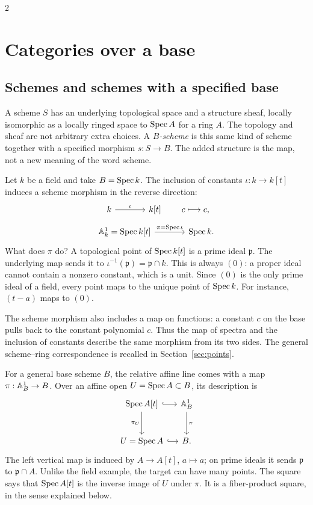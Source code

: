 \documentclass[12pt]{memoir}
\begin{document}
\begin{multicols}{2}
\section[Categories and categories over a base]{Categories over a base}\label{sec:categories}

\subsection{Schemes and schemes with a specified base}
A scheme $S$ has an underlying topological space and a structure sheaf,
locally isomorphic as a locally ringed space to $\operatorname{Spec} A$ for a ring $A$.
The topology and sheaf are not arbitrary extra choices. A
\emph{$B$-scheme} is this same kind of scheme together with a specified
morphism $s:S\to B$. The added structure is the map, not a new meaning
of the word scheme.

\begin{Ex}
Let $k$ be a field and take $B=\operatorname{Spec} k$. The inclusion of constants
$\iota:k\to k[t]$ induces a scheme morphism in the reverse direction:
\[
\begin{tikzcd}[column sep=large]
k \arrow[r,"\iota"] & k[t]
\end{tikzcd}
\qquad c\longmapsto c,
\]
\[
\begin{tikzcd}[column sep=large]
\bA^1_k=\Spec k[t] \arrow[r,"\pi=\Spec\iota"] & \Spec k.
\end{tikzcd}
\]
What does $\pi$ do? A topological point of $\operatorname{Spec} k[t]$ is a prime
ideal $\mathfrak p$. The underlying map sends it to
$\iota^{-1}(\mathfrak p)=\mathfrak p\cap k$. This is always $(0)$:
a proper ideal cannot contain a nonzero constant, which is a unit.
Since $(0)$ is the only prime ideal of a field, every point maps to
the unique point of $\operatorname{Spec} k$. For instance, $(t-a)$ maps to $(0)$.

The scheme morphism also includes a map on functions: a constant $c$
on the base pulls back to the constant polynomial $c$. Thus the map
of spectra and the inclusion of constants describe the same morphism
from its two sides. The general scheme--ring correspondence is recalled
in Section~\ref{sec:points}.
\end{Ex}

\begin{Ex}
For a general base scheme $B$, the relative affine line comes with
a map $\pi:\mathbb{A}^1_B\to B$. Over an affine open $U=\operatorname{Spec} A\subset B$,
its description is
\[
\begin{tikzcd}[column sep=small,row sep=large]
\Spec A[t] \arrow[r,hook] \arrow[d,"\pi_U"']
 &\bA^1_B \arrow[d,"\pi"]\\
U=\Spec A \arrow[r,hook] &B.
\end{tikzcd}
\]
The left vertical map is induced by $A\to A[t]$, $a\mapsto a$;
on prime ideals it sends $\mathfrak p$ to $\mathfrak p\cap A$.
Unlike the field example, the target can have many points.
The square says that $\operatorname{Spec} A[t]$ is the inverse image of $U$ under
$\pi$. It is a fiber-product square, in the sense explained below.


\end{Ex}
\end{multicols}
\end{document}

